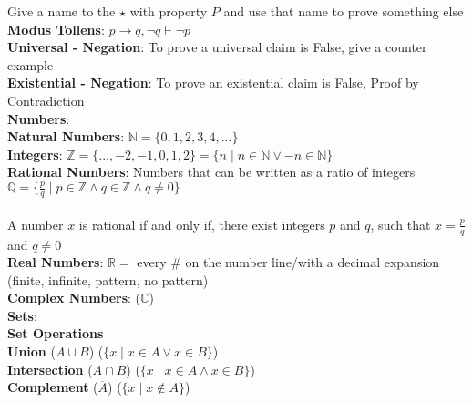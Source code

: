 \documentclass{article}
\begin{document}
			\indent{\hspace{\parindent}\hspace{\parindent}}Give a name to the $\star$ with property $P$ and use that name to prove something else \\
		\indent{\hspace{\parindent}}\textbf{Modus Tollens}: $p \rightarrow q, \neg q \vdash \neg p$ \\
		\indent{\hspace{\parindent}}\textbf{Universal - Negation}: To prove a universal claim is False, give a counter example \\
		\indent{\hspace{\parindent}}\textbf{Existential - Negation}: To prove an existential claim is False, Proof by Contradiction \\
\textbf{Numbers}: \\
	\indent{}\textbf{Natural Numbers}: $\mathbb{N} = \{ 0, 1, 2, 3, 4, ... \}$ \\
	\indent{}\textbf{Integers}: $\mathbb{Z} = \{ ..., -2, -1, 0, 1, 2 \} = \{ n \mid n \in \mathbb{N} \lor -n \in \mathbb{N} \}$ \\
	\indent{}\textbf{Rational Numbers}: Numbers that can be written as a ratio of integers \\
		\indent{\hspace{\parindent}}$\mathbb{Q} = \{ \frac{p}{q} \mid p \in \mathbb{Z} \land q \in \mathbb{Z} \land q \neq 0 \}$ \pagebreak \\
		\\\indent{\hspace{\parindent}}A number $x$ is rational if and only if, there exist integers $p$ and $q$, such that $x = \frac{p}{q}$ and $q \neq 0$ \\
	\indent{}\textbf{Real Numbers}: $\mathbb{R} =$ every \# on the number line/with a decimal expansion (finite, infinite, pattern, no pattern) \\
	\indent{}\textbf{Complex Numbers}: ($\mathbb{C}$) \\
\textbf{Sets}: \\
	\indent{}\textbf{Set Operations} \\
		\indent{\hspace{\parindent}}\textbf{Union} ($A \cup B$) ($\{x \mid x \in A \lor x \in B\}$) \\
		\indent{\hspace{\parindent}}\textbf{Intersection} ($A \cap B$) ($\{x \mid x \in A \land x \in B\}$) \\
		\indent{\hspace{\parindent}}\textbf{Complement} ($\overline A$) ($\{x \mid x \notin A\}$) \\
\end{document}
